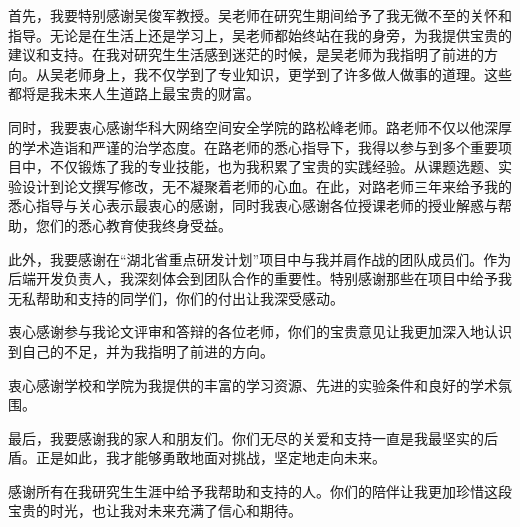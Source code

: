 

\begin{ack}
首先，我要特别感谢吴俊军教授。吴老师在研究生期间给予了我无微不至的关怀和指导。无论是在生活上还是学习上，吴老师都始终站在我的身旁，为我提供宝贵的建议和支持。在我对研究生生活感到迷茫的时候，是吴老师为我指明了前进的方向。从吴老师身上，我不仅学到了专业知识，更学到了许多做人做事的道理。这些都将是我未来人生道路上最宝贵的财富。

同时，我要衷心感谢华科大网络空间安全学院的路松峰老师。路老师不仅以他深厚的学术造诣和严谨的治学态度。在路老师的悉心指导下，我得以参与到多个重要项目中，不仅锻炼了我的专业技能，也为我积累了宝贵的实践经验。从课题选题、实验设计到论文撰写修改，无不凝聚着老师的心血。在此，对路老师三年来给予我的悉心指导与关心表示最衷心的感谢，同时我衷心感谢各位授课老师的授业解惑与帮助，您们的悉心教育使我终身受益。

此外，我要感谢在“湖北省重点研发计划”项目中与我并肩作战的团队成员们。作为后端开发负责人，我深刻体会到团队合作的重要性。特别感谢那些在项目中给予我无私帮助和支持的同学们，你们的付出让我深受感动。

衷心感谢参与我论文评审和答辩的各位老师，你们的宝贵意见让我更加深入地认识到自己的不足，并为我指明了前进的方向。

衷心感谢学校和学院为我提供的丰富的学习资源、先进的实验条件和良好的学术氛围。

最后，我要感谢我的家人和朋友们。你们无尽的关爱和支持一直是我最坚实的后盾。正是如此，我才能够勇敢地面对挑战，坚定地走向未来。

感谢所有在我研究生生涯中给予我帮助和支持的人。你们的陪伴让我更加珍惜这段宝贵的时光，也让我对未来充满了信心和期待。

\end{ack}
